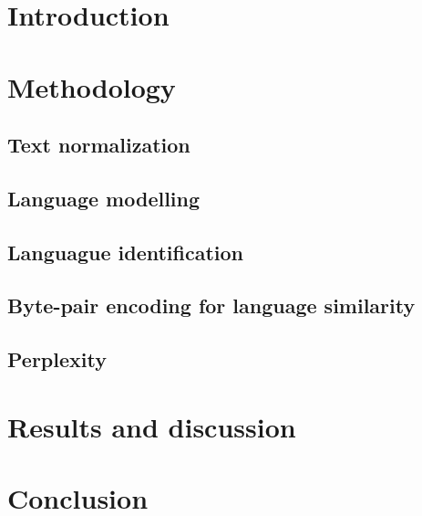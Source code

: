 \begin{abstract}
    
\end{abstract}
\section{Introduction}

\section{Methodology}
\subsection{Text normalization}
\subsection{Language modelling}
\subsection{Languague identification}
\subsection{Byte-pair encoding for language similarity}
\subsection{Perplexity}
\section{Results and discussion}
\section{Conclusion}
